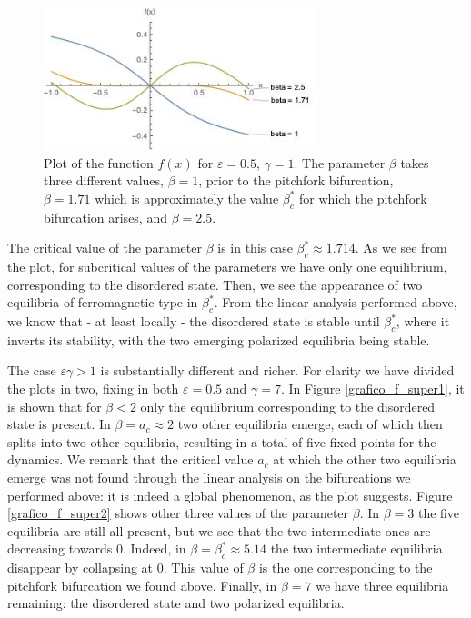 \documentclass[a4paper,10pt,leqno]{amsart}
\theoremstyle{plain}
\begin{document}
\begin{figure}   
\centering   
\includegraphics[width=8cm]{grafico_f.jpg}   
\caption{Plot of the function $f(x)$ for $\varepsilon = 0.5$, $\gamma =1$. The parameter $\beta$ takes three different values, $\beta = 1$, prior to the pitchfork bifurcation, $\beta = 1.71$ which is approximately the value $\beta^*_c$ for which the pitchfork bifurcation arises, and $\beta = 2.5$.}   
\label{grafico_f_subcritic}   
\end{figure}   
The critical value of the parameter $\beta$ is in this case $\beta^*_c \approx 1.714$. As we see from the plot, for subcritical values of the parameters we have only one equilibrium, corresponding to the disordered state. Then, we see the appearance of two equilibria of ferromagnetic type in $\beta^*_c$. From the linear analysis performed above, we know that - at least locally - the disordered state is stable until $\beta^{*}_c$, where it inverts its stability, with the two emerging polarized equilibria being stable. 

The case $\varepsilon \gamma > 1$ is substantially different and richer. For clarity we have divided the plots in two, fixing in both $\varepsilon = 0.5$ and $\gamma = 7$. In Figure \ref{grafico_f_super1}, it is shown that for $\beta < 2$ only the equilibrium corresponding to the disordered state is present. In $\beta = a_c \approx 2$ two other equilibria emerge, each of which then splits into two other equilibria, resulting in a total of five fixed points for the dynamics. We remark that the critical value $a_c$ at which the other two equilibria emerge was not found through the linear analysis on the bifurcations we performed above: it is indeed a global phenomenon, as the plot suggests.
Figure \ref{grafico_f_super2} shows other three values of the parameter $\beta$. In $\beta = 3$ the five equilibria are still all present, but we see that the two intermediate ones are decreasing towards $0$. Indeed, in $\beta = \beta^{*}_c \approx 5.14$ the two intermediate equilibria disappear by collapsing at $0$. This value of $\beta$ is the one corresponding to the pitchfork bifurcation we found above. Finally, in $\beta = 7$ we have three equilibria remaining: the disordered state and two polarized equilibria.
\end{document}
